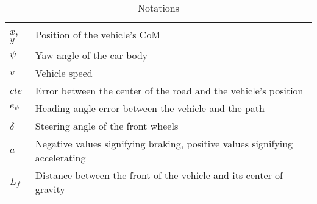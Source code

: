 \begin{table}[h]
	\caption{Notations}
	\label{tab:notations}
	\begin{tabular}{p{1.45cm} p{15.35cm}}
		\toprule
		$x$, $y$ & Position of the vehicle's CoM \\
		$\psi$ & Yaw angle of the car body \\
		$v$ & Vehicle speed \\
                $cte$ & Error between the center of the road and the vehicle's position \\
                $e_{\psi}$ & Heading angle error between the vehicle and the path \\
		$\delta$ & Steering angle of the front wheels \\
                $a$ & Negative values signifying braking, positive values signifying accelerating \\
                $L_f$ & Distance between the front of the vehicle and its center of gravity\\
		\bottomrule
	\end{tabular}
\end{table}
